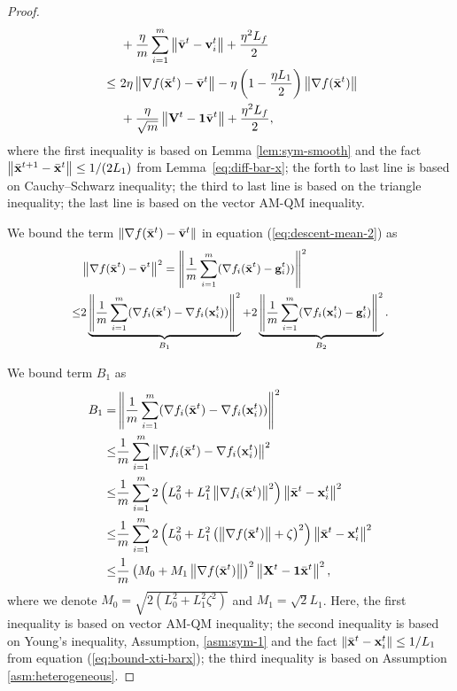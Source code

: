 \documentclass[sigconf]{acmart}
\newcommand{\Norm}[1]{\left\| #1 \right\|}
\def\vone{{\bf{1}}}
\def\vg{{\bf{g}}}
\def\vv{{\bf{v}}}
\def\vx{{\bf{x}}}
\def\mV {{\bf V}}
\def\mX {{\bf X}}
\theoremstyle{plain}
\def\bx{{\bar\vx}}
\def\bv{{\bar\vv}}
\begin{document}
\begin{proof}
\begin{align}
\begin{split}
& + \frac{\eta}{m}\sum_{i=1}^m \Norm{\bv^t - \vv^t_i} + \frac{\eta^2L_f}{2} \\
~\leq~ & 2\eta\Norm{\nabla f(\bx^t)-\bv^t} - \eta\left(1 - \frac{\eta L_1}{2}\right)\Norm{\nabla f(\bx^t)} \\
& + \frac{\eta}{\sqrt{m}}\Norm{\mV^t-\vone\bv^t}
+ \frac{\eta^2L_f}{2}, 
\end{split}
\end{align}
where the first inequality is based on Lemma \ref{lem:sym-smooth} and the fact $\Norm{\bx^{t+1} - \bx^t} \leq 1/(2L_1)$ from Lemma~\ref{eq:diff-bar-x};
the forth to last line is based on Cauchy--Schwarz inequality; 
the third to last line is based on the triangle inequality;
the last line is based on the vector AM-QM inequality.

 
We bound the term $\Norm{\nabla f(\bx^t)-\bv^t}$ in equation (\ref{eq:descent-mean-2}) as
\begin{align}\label{eq:diff-grad-v0}
\small\begin{split}    
 & \Norm{\nabla f(\bx^t)-\bv^t}^2 
= \Norm{\frac{1}{m}\sum_{i=1}^m (\nabla f_i(\bx^t) - \vg_i^t))}^2 \\
\leq & 2\underbrace{\Norm{\frac{1}{m}\sum_{i=1}^m (\nabla f_i(\bx^t) - \nabla f_i(\vx_i^t))}^2}_{B_1} 
+ 2\underbrace{\Norm{\frac{1}{m}\sum_{i=1}^m (\nabla f_i(\vx_i^t)-\vg_i^t)}^2}_{B_2}. 
\end{split}
\end{align}

We bound term $B_1$ as
\begin{align}\label{eq:diff-grad-v1}
\begin{split}     
B_1= & \Norm{\frac{1}{m}\sum_{i=1}^m (\nabla f_i(\bx^t) - \nabla f_i(\vx_i^t))}^2 \\
\leq & \frac{1}{m}\sum_{i=1}^m\Norm{\nabla f_i(\bx^t) - \nabla f_i(\vx_i^t)}^2 \\
\leq &  \frac{1}{m}\sum_{i=1}^m 2\left(L_0^2 + L_1^2\Norm{\nabla f_i(\bx^t)}^2\right) \Norm{\bx^t-\vx_i^t}^2 \\
\leq &  \frac{1}{m}\sum_{i=1}^m 2\left(L_0^2 + L_1^2\left(\Norm{\nabla f(\bx^t)}+\zeta\right)^2\right) \Norm{\bx^t-\vx_i^t}^2 \\
\leq &  \frac{1}{m}\left(M_0 + M_1\Norm{\nabla f(\bx^t)}\right)^2\Norm{\mX^t-\vone\bx^t}^2,
\end{split}
\end{align}
where we denote $M_0=\sqrt{2(L_0^2 +L_1^2\zeta^2)}$ and $M_1=\sqrt{2}L_1$. 
Here, the first inequality is based on vector AM-QM inequality; 
the second inequality is based on Young's inequality, Assumption, \ref{asm:sym-1} {and the fact $\Norm{\bx^t-\vx_i^t}\leq1/L_1$ from equation (\ref{eq:bound-xti-barx})};
the third inequality is based on Assumption \ref{asm:heterogeneous}. 


\end{proof}
\end{document}
